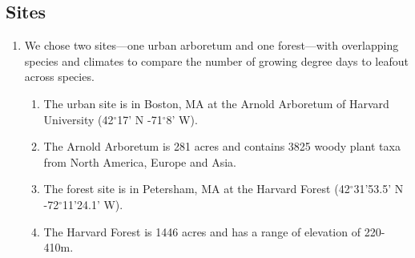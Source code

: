 \documentclass{article}\usepackage[]{graphicx}\usepackage[]{color}
\begin{document}
\subsection*{Sites}
\begin{enumerate}
\item We chose two sites---one urban arboretum and one forest---with overlapping species and climates to compare the number of growing degree days to leafout across species. 
  \begin{enumerate}
  \item The urban site is in Boston, MA at the Arnold Arboretum of Harvard University (42$^{\circ}$17' N -71$^{\circ}$8' W).
  \item The Arnold Arboretum is 281 acres and contains 3825 woody plant taxa from North America, Europe and Asia.
  \item The forest site is in Petersham, MA at the Harvard Forest (42$^{\circ}$31'53.5' N -72$^{\circ}$11'24.1' W).
  \item The Harvard Forest is 1446 acres and has a range of elevation of 220-410m. 
  \end{enumerate}


\end{enumerate}
\end{document}
